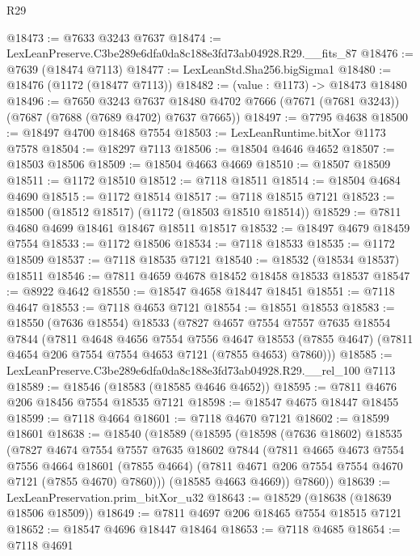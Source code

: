 \begin{lexlean}{R29}
\begin{coremodule}
@18473 := @7633 @3243 @7637
@18474 := LexLeanPreserve.C3be289e6dfa0da8c188e3fd73ab04928.R29.__fits_87
@18476 := @7639 (@18474 @7113)
@18477 := LexLeanStd.Sha256.bigSigma1
@18480 := @18476 (@1172 (@18477 @7113))
@18482 := (value : @1173) -> @18473 @18480
@18496 := @7650
    @3243
    @7637
    @18480
    @4702
    @7666
    (@7671 (@7681 @3243))
    (@7687 (@7688 (@7689 @4702) @7637 @7665))
@18497 := @7795 @4638
@18500 := @18497 @4700 @18468 @7554
@18503 := LexLeanRuntime.bitXor @1173 @7578
@18504 := @18297 @7113
@18506 := @18504 @4646 @4652
@18507 := @18503 @18506
@18509 := @18504 @4663 @4669
@18510 := @18507 @18509
@18511 := @1172 @18510
@18512 := @7118 @18511
@18514 := @18504 @4684 @4690
@18515 := @1172 @18514
@18517 := @7118 @18515 @7121
@18523 := @18500 (@18512 @18517) (@1172 (@18503 @18510 @18514))
@18529 := @7811 @4680 @4699 @18461 @18467 @18511 @18517
@18532 := @18497 @4679 @18459 @7554
@18533 := @1172 @18506
@18534 := @7118 @18533
@18535 := @1172 @18509
@18537 := @7118 @18535 @7121
@18540 := @18532 (@18534 @18537) @18511
@18546 := @7811 @4659 @4678 @18452 @18458 @18533 @18537
@18547 := @8922 @4642
@18550 := @18547 @4658 @18447 @18451
@18551 := @7118 @4647
@18553 := @7118 @4653 @7121
@18554 := @18551 @18553
@18583 := @18550
    (@7636 @18554)
    @18533
    (@7827
      @4657
      @7554
      @7557
      @7635
      @18554
      @7844
      (@7811
        @4648
        @4656
        @7554
        @7556
        @4647
        @18553
        (@7855 @4647)
        (@7811 @4654 @206 @7554 @7554 @4653 @7121 (@7855 @4653) @7860)))
@18585 := LexLeanPreserve.C3be289e6dfa0da8c188e3fd73ab04928.R29.__rel_100 @7113
@18589 := @18546 (@18583 (@18585 @4646 @4652))
@18595 := @7811 @4676 @206 @18456 @7554 @18535 @7121
@18598 := @18547 @4675 @18447 @18455
@18599 := @7118 @4664
@18601 := @7118 @4670 @7121
@18602 := @18599 @18601
@18638 := @18540
    (@18589
      (@18595
        (@18598
          (@7636 @18602)
          @18535
          (@7827
            @4674
            @7554
            @7557
            @7635
            @18602
            @7844
            (@7811
              @4665
              @4673
              @7554
              @7556
              @4664
              @18601
              (@7855 @4664)
              (@7811 @4671 @206 @7554 @7554 @4670 @7121 (@7855 @4670) @7860)))
          (@18585 @4663 @4669))
        @7860))
@18639 := LexLeanPreservation.prim_bitXor_u32
@18643 := @18529 (@18638 (@18639 @18506 @18509))
@18649 := @7811 @4697 @206 @18465 @7554 @18515 @7121
@18652 := @18547 @4696 @18447 @18464
@18653 := @7118 @4685
@18654 := @7118 @4691

\end{coremodule}
\end{lexlean}
